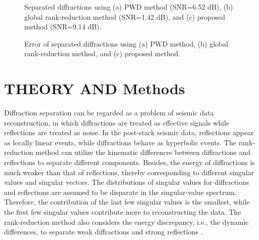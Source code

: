 \documentclass[10pt]{IEEEtran}
\DeclareRobustCommand{\new}[1]{#1}
\begin{document}
\begin{figure}[htb!]
 \centering
\caption{Separated diffractions using (a) PWD method (SNR=6.52 dB), (b) global rank-reduction method (SNR=1.42 dB), and (c) proposed method (SNR=9.14 dB).}
\label{fig:s-pwd-n-0,s-grr-n-0,s-lrra-n-0}
\end{figure}

\begin{figure}[htb!]
\centering
{}
\caption{\new{Error of separated diffractions using (a) PWD method, (b) global rank-reduction method, and (c) proposed method.} \color{black}{}}
\label{fig:s-pwd-e-0,s-grr-e-0,s-lrra-e-0}
\end{figure}

\section*{THEORY AND Methods}
Diffraction separation can be regarded as a problem of seismic data reconstruction, in which diffractions are treated as effective signals while reflections are treated as noise.  In the post-stack seismic data, reflections appear as locally linear events, while diffractions behave as hyperbolic events.  The rank-reduction method can utilize the kinematic differences between diffractions and reflections to separate different components. Besides, the energy of diffractions is much weaker than that of reflections, thereby corresponding to different singular values and singular vectors. The distributions of singular values for diffractions and reflections are assumed to be disparate in the singular-value spectrum. Therefore, the contribution of the last few singular values is the smallest, while the first few singular values contribute more to reconstructing the data. The rank-reduction method also considers the energy discrepancy, i.e., the dynamic differences, to separate weak diffractions and strong reflections \cite{2010Separation, 2016Diffraction}.    
\end{document}
